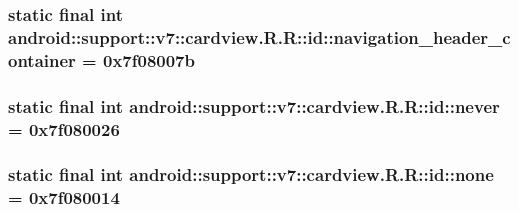 \hypertarget{classandroid_1_1support_1_1v7_1_1cardview_1_1_r_1_1id_71cf5f6c848a613bb783905c8a0db3e0}{
\subsubsection[{navigation\_\-header\_\-container}]{\setlength{\rightskip}{0pt plus 5cm}static final int android::support::v7::cardview.R.R::id::navigation\_\-header\_\-container = 0x7f08007b}}
\label{classandroid_1_1support_1_1v7_1_1cardview_1_1_r_1_1id_71cf5f6c848a613bb783905c8a0db3e0}


\hypertarget{classandroid_1_1support_1_1v7_1_1cardview_1_1_r_1_1id_5b2cd1cd2c17c968d3434654fad7d904}{
\subsubsection[{never}]{\setlength{\rightskip}{0pt plus 5cm}static final int android::support::v7::cardview.R.R::id::never = 0x7f080026}}
\label{classandroid_1_1support_1_1v7_1_1cardview_1_1_r_1_1id_5b2cd1cd2c17c968d3434654fad7d904}


\hypertarget{classandroid_1_1support_1_1v7_1_1cardview_1_1_r_1_1id_c0a068be26b9e8f2eb2afa2b6df72a0b}{
\subsubsection[{none}]{\setlength{\rightskip}{0pt plus 5cm}static final int android::support::v7::cardview.R.R::id::none = 0x7f080014}}
\label{classandroid_1_1support_1_1v7_1_1cardview_1_1_r_1_1id_c0a068be26b9e8f2eb2afa2b6df72a0b}


